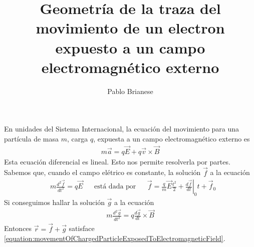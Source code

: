 \documentclass{article}
\title{Geometría de la traza del movimiento de un electron expuesto a un campo electromagnético externo}
\author{Pablo Brianese}
\begin{document}
  \maketitle
  En unidades del Sistema Internacional, la ecuación del movimiento para una partícula de masa \(m\), carga \(q\), expuesta a un campo electromagnético externo es
  \begin{align}
    \label{equation:movementOfChargedParticleExposedToElectromagneticField}
    m \vec{a}
    =
    q \vec{E} + q \vec{v} \times \vec{B}
  \end{align}
  Esta ecuación diferencial es lineal.
  Esto nos permite resolverla por partes.
  Sabemos que, cuando el campo elétrico es constante, la solución \(\vec{f}\) a la ecuación 
  \begin{align}
    &m \frac{d^2 \vec{f}}{d t^2} = q \vec{E}
    &&\text{está dada por}
    &&\vec{f} = \frac{q}{m} \vec{E} \frac{t^2}{2} + \left.\frac{d \vec{f}}{d t}\right|_0 t + \vec{f}_0
  \end{align}
  Si conseguimos hallar la solución \(\vec{g}\) a la ecuación
  \begin{align}
    m \frac{d^2 \vec{g}}{d t^2} = q \frac{d \vec{g}}{d t} \times \vec{B}
  \end{align}
  Entonces \(\vec{r} = \vec{f} + \vec{g}\) satisface \eqref{equation:movementOfChargedParticleExposedToElectromagneticField}.
  \begingroup
  \allowdisplaybreaks
\end{document}

